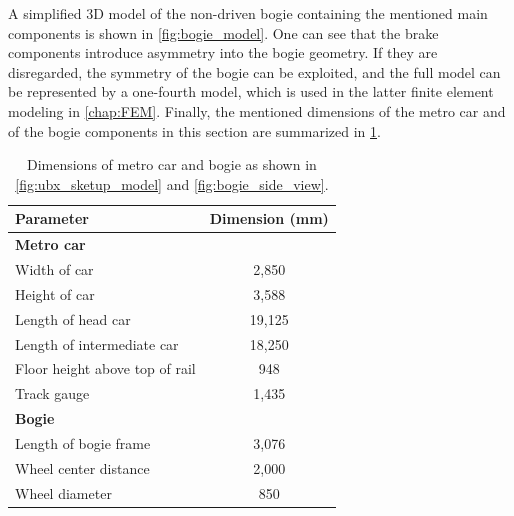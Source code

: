 A simplified 3D model of the non-driven bogie containing the mentioned main components is shown in \cref{fig:bogie_model}. One can see that the brake components introduce asymmetry into the bogie geometry. If they are disregarded, the symmetry of the bogie can be exploited, and the full model can be represented by a one-fourth model, which is used in the latter finite element modeling in \cref{chap:FEM}.
Finally, the mentioned dimensions of the metro car and of the bogie components in this section are summarized in \cref{tab:vehicle_dimensions}.
\begin{table}[H]
	\caption{Dimensions of metro car and bogie as shown in \cref{fig:ubx_sketup_model} and \cref{fig:bogie_side_view}.}
	\centering
	\begin{tabular}{lc}
		\toprule
		Parameter                    	   &  Dimension (mm)    \\
		\midrule
		\textbf{Metro car} 				   & 		 \\
		Width of car                       & 2,850   \\
		Height of car  					   & 3,588   \\
		Length of head car  			   & 19,125  \\
		Length of intermediate car 		   & 18,250  \\
		Floor height above top of rail     & 948     \\
		Track gauge              		   & 1,435   \\
		\textbf{Bogie} 					   & 		 \\
		Length of bogie frame    		   & 3,076   \\
		Wheel center distance 			   & 2,000   \\ 
		Wheel diameter  				   & 850     \\ 
		\bottomrule
	\end{tabular}
	\label{tab:vehicle_dimensions}
\end{table}